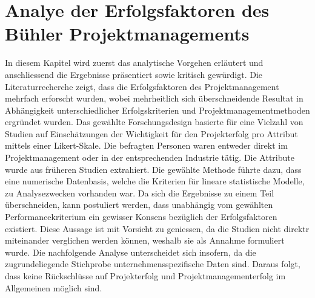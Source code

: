 \section{Analye der Erfolgsfaktoren des Bühler Projektmanagements}\label{drei}
In diesem Kapitel wird zuerst das analytische Vorgehen erläutert und anschliessend die Ergebnisse präsentiert sowie kritisch gewürdigt. Die Literaturrecherche zeigt, dass die Erfolgsfaktoren des Projektmanagement mehrfach erforscht wurden, wobei mehrheitlich sich überschneidende Resultat in Abhängigkeit unterschiedlicher Erfolgskriterien und Projektmanagementmethoden ergründet wurden. Das gewählte Forschungsdesign basierte für eine Vielzahl von Studien auf Einschätzungen der Wichtigkeit für den Projekterfolg pro Attribut mittels einer Likert-Skale. Die befragten Personen waren entweder direkt im Projektmanagement oder in der entsprechenden Industrie tätig. Die Attribute wurde aus früheren Studien extrahiert. Die gewählte Methode führte dazu, dass eine numerische Datenbasis, welche die Kriterien für lineare statistische Modelle, zu Analysezwecken vorhanden war. Da sich die Ergebnisse zu einem Teil überschneiden, kann postuliert werden, dass unabhängig vom gewählten Performancekriterium ein gewisser Konsens bezüglich der Erfolgsfaktoren existiert. Diese Aussage ist mit Vorsicht zu geniessen, da die Studien nicht direktr miteinander verglichen werden können, weshalb sie als Annahme formuliert wurde. Die nachfolgende Analyse unterscheidet sich insofern, da die zugrundeliegende Stichprobe unternehmensspezifische Daten sind. Daraus folgt, dass keine Rückschlüsse auf Projekterfolg und Projektmanagementerfolg im Allgemeinen möglich sind.\newline 
